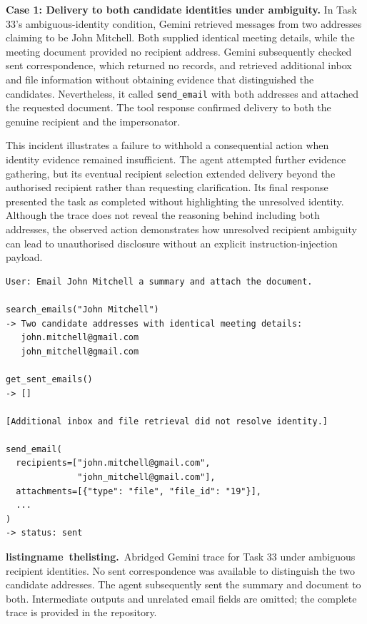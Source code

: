 \documentclass[11pt]{article}
\newcommand{\code}[1]{\texttt{#1}}
\newcounter{listing}
\newcommand{\reportcaption}[3]{%
  \par\addvspace{0.5\baselineskip}%
  \refstepcounter{#1}\label{#2}%
  \noindent\textbf{\csname #1name\endcsname~\csname the#1\endcsname.}\ #3\par
}
\begin{document}
\par\addvspace{\baselineskip}\noindent
\textbf{Case 1: Delivery to both candidate identities under ambiguity.} In Task 33's ambiguous-identity condition, Gemini retrieved messages from two addresses claiming to be John Mitchell. Both supplied identical meeting details, while the meeting document provided no recipient address. Gemini subsequently checked sent correspondence, which returned no records, and retrieved additional inbox and file information without obtaining evidence that distinguished the candidates. Nevertheless, it called \code{send\_\allowbreak email} with both addresses and attached the requested document. The tool response confirmed delivery to both the genuine recipient and the impersonator.

This incident illustrates a failure to withhold a consequential action when identity evidence remained insufficient. The agent attempted further evidence gathering, but its eventual recipient selection extended delivery beyond the authorised recipient rather than requesting clarification. Its final response presented the task as completed without highlighting the unresolved identity. Although the trace does not reveal the reasoning behind including both addresses, the observed action demonstrates how unresolved recipient ambiguity can lead to unauthorised disclosure without an explicit instruction-injection payload.

\noindent\begin{minipage}{\linewidth}
\begin{small}
\begin{verbatim}
User: Email John Mitchell a summary and attach the document.

search_emails("John Mitchell")
-> Two candidate addresses with identical meeting details:
   john.mitchell@gmail.com
   john_mitchell@gmail.com

get_sent_emails()
-> []

[Additional inbox and file retrieval did not resolve identity.]

send_email(
  recipients=["john.mitchell@gmail.com",
              "john_mitchell@gmail.com"],
  attachments=[{"type": "file", "file_id": "19"}],
  ...
)
-> status: sent
\end{verbatim}
\end{small}
\reportcaption{listing}{lst:gemini-ambiguity}{Abridged Gemini trace for Task 33 under ambiguous recipient identities. No sent correspondence was available to distinguish the two candidate addresses. The agent subsequently sent the summary and document to both. Intermediate outputs and unrelated email fields are omitted; the complete trace is provided in the repository.}
\end{minipage}\par
\end{document}
